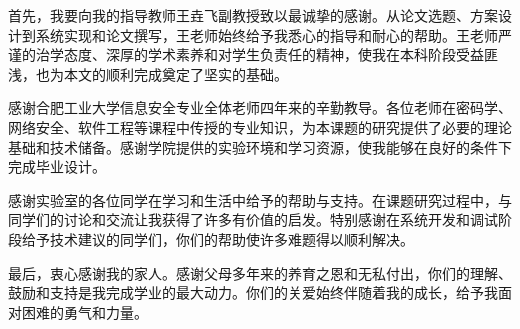 \begin{acknowledge}

首先，我要向我的指导教师王垚飞副教授致以最诚挚的感谢。从论文选题、方案设计到系统实现和论文撰写，王老师始终给予我悉心的指导和耐心的帮助。王老师严谨的治学态度、深厚的学术素养和对学生负责任的精神，使我在本科阶段受益匪浅，也为本文的顺利完成奠定了坚实的基础。

感谢合肥工业大学信息安全专业全体老师四年来的辛勤教导。各位老师在密码学、网络安全、软件工程等课程中传授的专业知识，为本课题的研究提供了必要的理论基础和技术储备。感谢学院提供的实验环境和学习资源，使我能够在良好的条件下完成毕业设计。

感谢实验室的各位同学在学习和生活中给予的帮助与支持。在课题研究过程中，与同学们的讨论和交流让我获得了许多有价值的启发。特别感谢在系统开发和调试阶段给予技术建议的同学们，你们的帮助使许多难题得以顺利解决。

最后，衷心感谢我的家人。感谢父母多年来的养育之恩和无私付出，你们的理解、鼓励和支持是我完成学业的最大动力。你们的关爱始终伴随着我的成长，给予我面对困难的勇气和力量。

\end{acknowledge}
